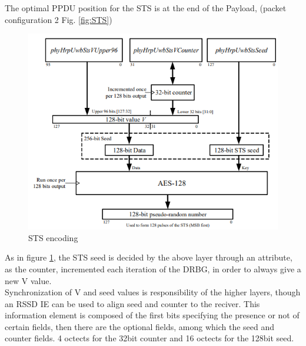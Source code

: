 \documentclass[conference]{IEEEtran}
\begin{document}
The optimal PPDU position for the STS is at the end of the Payload, (packet configuration 2 Fig.
\ref{fig:STS})\\

\begin{figure}[!h]
  \centering
  \includegraphics[width=\linewidth]{STS-encoding}
  \caption{STS encoding}
  \label{fig:STS-enc}
\end{figure}

As in figure \ref{fig:STS-enc}, the STS seed is decided by the above layer through an attribute,
as the counter, incremented each iteration of the DRBG, in order to always give a new V value.\\
Synchronization of V and seed values is responsibility of the higher layers, though an
RSSD IE can be used to align seed and counter to the reciver. This information element is
composed of the first bits specifying the presence or not of certain fields, then there are
the optional fields, among which the seed and counter fields. 4 octects for the 32bit counter
and 16 octects for the 128bit seed.\\
\end{document}
